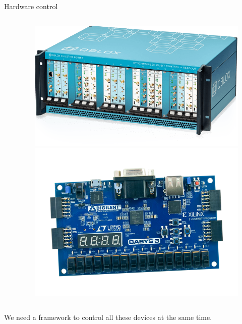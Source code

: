 \documentclass[11pt]{beamer}
\begin{document}
\begin{frame}{Hardware control}
\begin{columns}
\begin{column}{0.5 \textwidth}
        \end{column}
        \begin{column}{0.5 \textwidth}
            \begin{figure}
                \includegraphics[height = 0.3 \textheight]{figures/qblox.png}
                \includegraphics[height = 0.3 \textheight]{figures/fpga.png}
            \end{figure}
            
        \end{column}
    \end{columns}
  
   We need a framework to control all these devices at the same time.
    
\end{frame}
\end{document}
